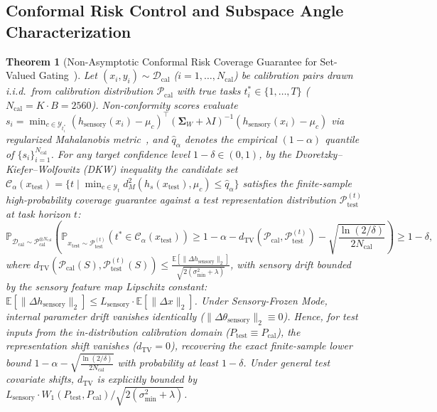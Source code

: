 \documentclass{article}
\newtheorem{theorem}{Theorem}[section]
\begin{document}
\subsection{Conformal Risk Control and Subspace Angle Characterization}
\label{sec:proof_conformal_coverage}
\begin{theorem}[Non-Asymptotic Conformal Risk Coverage Guarantee for Set-Valued Gating~\cite{vovk2005algorithmic,angelopoulos2021gentle}]
\label{thm:conformal_coverage}
Let $(x_i, y_i) \sim \mathcal{D}_{\mathrm{cal}}$ ($i=1, \dots, N_{\mathrm{cal}}$) be calibration pairs drawn i.i.d.\ from calibration distribution $\mathcal{P}_{\mathrm{cal}}$ with true tasks $t_i^* \in \{1, \dots, T\}$ ($N_{\mathrm{cal}} = K \cdot B = 2560$). Non-conformity scores evaluate $s_i = \min_{c \in \mathcal{Y}_{t_i^*}} (h_{\mathrm{sensory}}(x_i) - \mu_c)^\top (\mathbf{\Sigma}_W + \lambda I)^{-1} (h_{\mathrm{sensory}}(x_i) - \mu_c)$ via regularized Mahalanobis metric~\cite{lee2018simple}, and $\hat{q}_\alpha$ denotes the empirical $(1-\alpha)$ quantile of $\{s_i\}_{i=1}^{N_{\mathrm{cal}}}$. For any target confidence level $1 - \delta \in (0, 1)$, by the Dvoretzky--Kiefer--Wolfowitz (DKW) inequality the candidate set $\mathcal{C}_\alpha(x_{\mathrm{test}}) = \{ t \mid \min_{c \in \mathcal{Y}_t} d_M^2(h_s(x_{\mathrm{test}}), \mu_c) \le \hat{q}_\alpha \}$ satisfies the finite-sample high-probability coverage guarantee against a test representation distribution $\mathcal{P}_{\mathrm{test}}^{(t)}$ at task horizon $t$:
\begin{equation}
\label{eq:dkw_conformal_bound}
    \mathbb{P}_{\mathcal{D}_{\mathrm{cal}} \sim \mathcal{P}_{\mathrm{cal}}^{\otimes N_{\mathrm{cal}}}}\left( \mathbb{P}_{x_{\mathrm{test}} \sim \mathcal{P}_{\mathrm{test}}^{(t)}}\left( t^* \in \mathcal{C}_\alpha(x_{\mathrm{test}}) \right) \ge 1 - \alpha - d_{\mathrm{TV}}(\mathcal{P}_{\mathrm{cal}}, \mathcal{P}_{\mathrm{test}}^{(t)}) - \sqrt{\frac{\ln(2/\delta)}{2 N_{\mathrm{cal}}}} \right) \ge 1 - \delta,
\end{equation}
where $d_{\mathrm{TV}}(\mathcal{P}_{\mathrm{cal}}(S), \mathcal{P}_{\mathrm{test}}^{(t)}(S)) \le \frac{\mathbb{E}[\|\Delta h_{\mathrm{sensory}}\|_2]}{\sqrt{2(\sigma_{\min}^2 + \lambda)}}$, with sensory drift bounded by the sensory feature map Lipschitz constant: $\mathbb{E}[\|\Delta h_{\mathrm{sensory}}\|_2] \le L_{\mathrm{sensory}} \cdot \mathbb{E}[\|\Delta x\|_2]$. Under Sensory-Frozen Mode, internal parameter drift vanishes identically ($\|\Delta \theta_{\mathrm{sensory}}\|_2 \equiv 0$). Hence, for test inputs from the in-distribution calibration domain ($P_{\mathrm{test}} \equiv P_{\mathrm{cal}}$), the representation shift vanishes ($d_{\mathrm{TV}} = 0$), recovering the exact finite-sample lower bound $1 - \alpha - \sqrt{\frac{\ln(2/\delta)}{2 N_{\mathrm{cal}}}}$ with probability at least $1 - \delta$. Under general test covariate shifts, $d_{\mathrm{TV}}$ is explicitly bounded by $L_{\mathrm{sensory}} \cdot W_1(P_{\mathrm{test}}, P_{\mathrm{cal}}) / \sqrt{2(\sigma_{\min}^2 + \lambda)}$.
\end{theorem}
\end{document}
